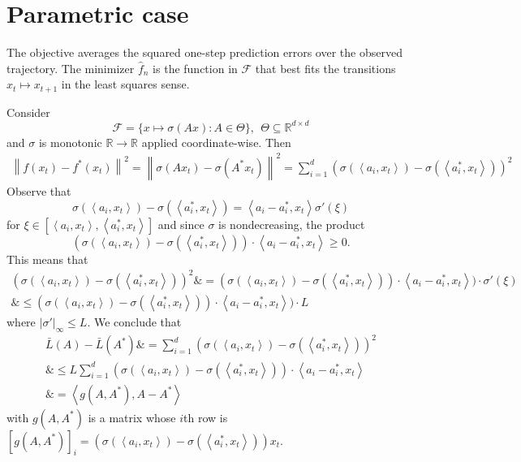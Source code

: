 \documentclass[11pt]{article}
\newcommand{\inner}[1]{\left\langle #1 \right\rangle}
\newcommand{\F}{\ensuremath{\mathcal F}}
\newcommand{\reals}{\ensuremath{\mathbb R}}
\newcommand{\condemploss}{\bar{L}}
\newcommand{\norm}[1]{\left\|#1\right\|}
\newcommand{\algo}{\widehat{f}_n}
\begin{document}
\section{Parametric case}
%
The objective averages the squared one-step prediction errors over the observed trajectory.
The minimizer \(\algo\) is the function in \(\F\) that best fits the transitions \(x_t \mapsto x_{t+1}\) in the least squares sense.







Consider $$\F = \{x\mapsto \sigma(A x): A\in \Theta\}, ~~\Theta\subseteq \reals^{d\times d}$$
and $\sigma$ is monotonic $\reals\to\reals$ applied coordinate-wise. Then
\begin{align}
	\norm{f(x_t)-f^*(x_t)}^2 = \norm{\sigma(Ax_t)-\sigma(A^* x_t)}^2 = \sum_{i=1}^d (\sigma(\inner{a_i,x_t})-\sigma(\inner{a_i^*,x_t}))^2
\end{align}
Observe that
$$\sigma(\inner{a_i,x_t})-\sigma(\inner{a_i^*,x_t}) = \inner{a_i-a_i^*,x_t} \sigma'(\xi)$$
for $\xi\in[\inner{a_i,x_t}, \inner{a_i^*,x_t}]$
and since $\sigma$ is nondecreasing, the product 
$$(\sigma(\inner{a_i,x_t})-\sigma(\inner{a_i^*,x_t}) )\cdot \inner{a_i-a_i^*,x_t} \geq 0.$$
This means that
\begin{align}
	(\sigma(\inner{a_i,x_t})-\sigma(\inner{a_i^*,x_t}))^2 \&= (\sigma(\inner{a_i,x_t})-\sigma(\inner{a_i^*,x_t})) \cdot \inner{a_i-a_i^*,x_t}) \cdot \sigma'(\xi)\\
	\&\leq (\sigma(\inner{a_i,x_t})-\sigma(\inner{a_i^*,x_t})) \cdot \inner{a_i-a_i^*,x_t}) \cdot L
\end{align}
where $|\sigma'|_\infty\leq L$. We conclude that
\begin{align}
	\condemploss(A)-\condemploss(A^*) \&= \sum_{i=1}^d (\sigma(\inner{a_i,x_t})-\sigma(\inner{a_i^*,x_t}))^2\\
	\&\leq L \sum_{i=1}^d (\sigma(\inner{a_i,x_t})-\sigma(\inner{a_i^*,x_t})) \cdot \inner{a_i-a_i^*,x_t}\\
	\&= \inner{g(A,A^*), A-A^*}
\end{align}
with $g(A,A^*)$ is a matrix whose $i$th row is $[g(A,A^*)]_i = (\sigma(\inner{a_i,x_t})-\sigma(\inner{a_i^*,x_t})) x_t$. 
\end{document}
